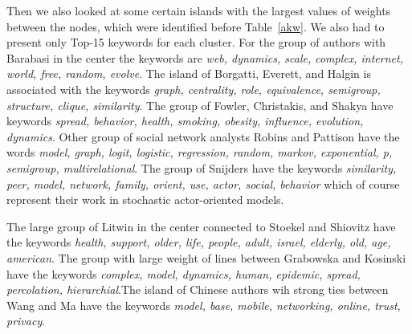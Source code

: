 \documentclass[11pt]{article} %
\begin{document}
Then we also looked at some certain islands with the largest values of weights between the nodes, which were identified before Table~\ref{akw}. We also had to present only Top-15 keywords for each cluster. For the group of authors with Barabasi in the center the keywords are \textit{web, dynamics, scale, complex, internet, world, free, random, evolve}. The island of Borgatti,  Everett, and Halgin is associated with the keywords \textit{graph, centrality, role, equivalence, semigroup, structure, clique, similarity}. The group of Fowler, Christakis, and Shakya have keywords \textit{spread, behavior, health, smoking, obesity, influence, evolution, dynamics}. Other group of social network analysts Robins and Pattison have the words \textit{model, graph, logit, logistic, regression, random, markov, exponential, p, semigroup, multirelational}. The group of Snijders have the keywords \textit{similarity, peer, model, network, family, orient, use, actor, social, behavior} which of course represent their work in stochastic actor-oriented models. \medskip

The large group of Litwin in the center connected to Stoekel and Shiovitz have the keywords \textit{health, support, older, life, people, adult, israel, elderly, old, age, american}. The group with large weight of lines between Grabowska and Kosinski have the keywords \textit{complex, model, dynamics, human, epidemic, spread, percolation, hierarchial}.The island of  Chinese authors wih strong ties between Wang and Ma have the keywords \textit{model, base, mobile, networking, online, trust, privacy}. \medskip
\end{document}

